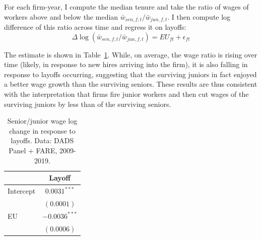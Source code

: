 
For each firm-year, I compute the median tenure and take the ratio of wages of workers above and below the median $\bar{w}_{sen,f,t}/\bar{w}_{jun,f,t}$. I then compute log difference of this ratio across time and regress it on layoffs:
\[ \Delta \log (\bar{w}_{sen,f,t}/\bar{w}_{jun,f,t}) = EU_{ft} + \epsilon_{ft} \]

The estimate is shown in Table~\ref{tab:layoff_response}. While, on average, the wage ratio is rising over time (likely, in response to new hires arriving into the firm), it is also falling in response to layoffs occurring, suggesting that the surviving juniors in fact enjoyed a better wage growth than the surviving seniors. These results are thus consistent with the interpretation that firms fire junior workers and then cut wages of the surviving juniors by less than of the surviving seniors.

\begin{table}
  \centering
  \begin{tabular}{lc}
    \hline
    & \multicolumn{1}{c}{Layoff}  \\
    \hline
     
    Intercept        &  $0.0031^{***}$       \\     
                        &  $(0.0001)$           \\     
    EU        & $-0.0036^{***}$      \\     
              &  $(0.0006)$ \\  
    \hline
  \end{tabular}
  \caption{Senior/junior wage log change in response to layoffs. Data: DADS Panel + FARE, 2009-2019.}
  \label{tab:layoff_response}
\end{table}
